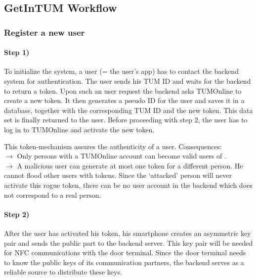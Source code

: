 \bigskip




\subsection{GetInTUM Workflow}\label{sec:workflow}

\subsubsection*{Register a new user}

\paragraph{Step 1)}
To initialize the system, a user (= the user's \app app) has to contact the backend system for authentication.
The user sends his TUM ID and waits for the backend to return a token.
Upon such an user request the backend asks TUMOnline to create a new token.
It then generates a pseudo ID for the user and saves it in a database, together with the corresponding TUM ID and the new token.
This data set is finally returned to the user.
Before proceeding with step 2, the user has to log in to TUMOnline and activate the new token.

\medskip

\noindent This token-mechanism assures the authenticity of a user. Consequences:\\
$\rightarrow$ Only persons with a TUMOnline account can become valid users of \app.\\
$\rightarrow$ A malicious user can generate at most one token for a different person. He cannot flood other users with tokens. Since the `attacked' person will never activate this rogue token, there can be no user account in the backend which does not correspond to a real person.



\paragraph{Step 2)}
After the user has activated his token, his smartphone creates an asymmetric key pair and sends the public part to the backend server.
This key pair will be needed for NFC communications with the door terminal.
Since the door terminal needs to know the public keys of its communication partners, the backend serves as a reliable source to distribute these keys.


